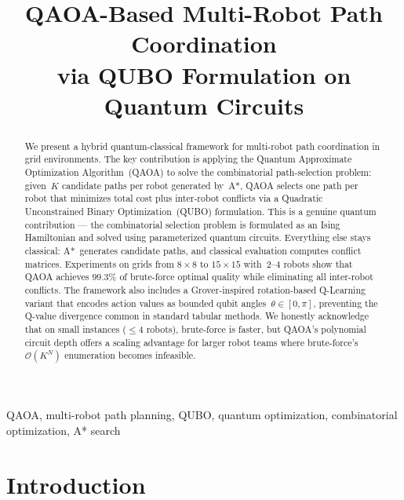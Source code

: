 \documentclass[conference]{IEEEtran}
\begin{document}
\title{QAOA-Based Multi-Robot Path Coordination\\via QUBO Formulation on Quantum Circuits}

\author{
}

\maketitle

\begin{abstract}
We present a hybrid quantum-classical framework for multi-robot path coordination in grid environments. The key contribution is applying the Quantum Approximate Optimization Algorithm~(QAOA) to solve the combinatorial path-selection problem: given~$K$ candidate paths per robot generated by~A*, QAOA selects one path per robot that minimizes total cost plus inter-robot conflicts via a Quadratic Unconstrained Binary Optimization~(QUBO) formulation. This is a genuine quantum contribution --- the combinatorial selection problem is formulated as an Ising Hamiltonian and solved using parameterized quantum circuits. Everything else stays classical: A*~generates candidate paths, and classical evaluation computes conflict matrices. Experiments on grids from $8\times8$ to $15\times15$ with~2--4 robots show that QAOA achieves 99.3\% of brute-force optimal quality while eliminating all inter-robot conflicts. The framework also includes a Grover-inspired rotation-based Q-Learning variant that encodes action values as bounded qubit angles~$\theta \in [0,\pi]$, preventing the Q-value divergence common in standard tabular methods. We honestly acknowledge that on small instances ($\leq4$ robots), brute-force is faster, but QAOA's polynomial circuit depth offers a scaling advantage for larger robot teams where brute-force's $\mathcal{O}(K^N)$ enumeration becomes infeasible.
\end{abstract}

\begin{IEEEkeywords}
QAOA, multi-robot path planning, QUBO, quantum optimization, combinatorial optimization, A* search
\end{IEEEkeywords}

\section{Introduction}
\end{document}

